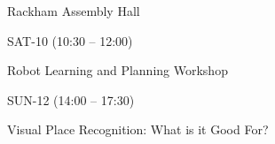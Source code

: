 \documentclass{article}
\begin{document}
\rssheader[2in]

\rssbig
\begin{center}
Rackham Assembly Hall
\end{center}

\vfill

\rssmed
\begin{center}
SAT-10 (10:30 -- 12:00)
\end{center}

\rsssm
\begin{center}
Robot Learning and Planning Workshop
\end{center}

\vfill

\rssmed
\begin{center}
SUN-12 (14:00 -- 17:30)
\end{center}

\rsssm
\begin{center}
Visual Place Recognition: What is it Good For?
\end{center}

\vfill
\end{document}
